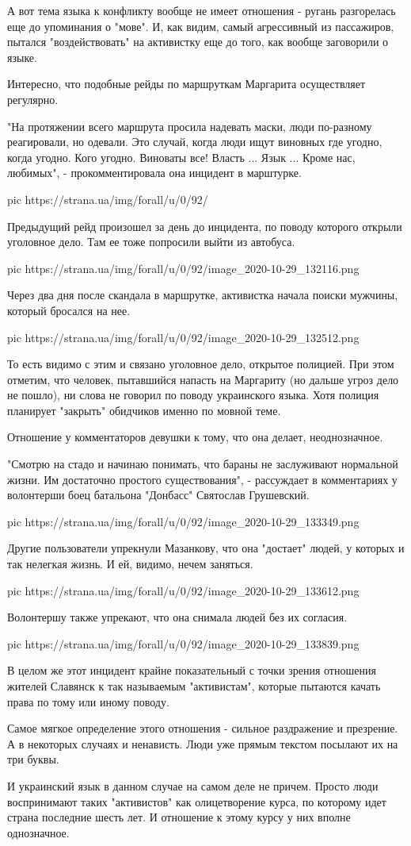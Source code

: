 А вот тема языка к конфликту вообще не имеет отношения - ругань разгорелась еще
до упоминания о "мове". И, как видим, самый агрессивный из пассажиров, пытался
"воздействовать" на активистку еще до того, как вообще заговорили о языке. 

Интересно, что подобные рейды по маршруткам Маргарита осуществляет регулярно. 

"На протяжении всего маршрута просила надевать маски, люди по-разному
реагировали, но одевали. Это случай, когда люди ищут виновных где угодно, когда
угодно. Кого угодно. Виноваты все! Власть ... Язык ... Кроме нас, любимых", -
прокомментировала она инцидент в марштурке.

\ifcmt
pic https://strana.ua/img/forall/u/0/92/%
\fi

Предыдущий рейд произошел за день до инцидента, по поводу которого открыли
уголовное дело. Там ее тоже попросили выйти из автобуса. 

\ifcmt
pic https://strana.ua/img/forall/u/0/92/image_2020-10-29_132116.png
\fi

Через два дня после скандала в маршрутке, активистка начала поиски мужчины,
который бросался на нее. 

\ifcmt
pic https://strana.ua/img/forall/u/0/92/image_2020-10-29_132512.png
\fi

То есть видимо с этим и связано уголовное дело, открытое полицией. При этом
отметим, что человек, пытавшийся напасть на Маргариту (но дальше угроз дело не
пошло), ни слова не говорил по поводу украинского языка. Хотя полиция планирует
"закрыть" обидчиков именно по мовной теме. 

Отношение у комментаторов девушки к тому, что она делает, неоднозначное. 

"Смотрю на стадо и начинаю понимать, что бараны не заслуживают нормальной
жизни. Им достаточно простого существования", - рассуждает в комментариях у
волонтерши боец батальона "Донбасс" Святослав Грушевский.

\ifcmt
pic https://strana.ua/img/forall/u/0/92/image_2020-10-29_133349.png
\fi

Другие пользователи упрекнули Мазанкову, что она "достает" людей, у которых и
так нелегкая жизнь. И ей, видимо, нечем заняться. 

\ifcmt
pic https://strana.ua/img/forall/u/0/92/image_2020-10-29_133612.png
\fi

Волонтершу также упрекают, что она снимала людей без их согласия.

\ifcmt
pic https://strana.ua/img/forall/u/0/92/image_2020-10-29_133839.png
\fi

В целом же этот инцидент крайне показательный с точки зрения отношения жителей
Славянск к так называемым "активистам", которые пытаются качать права по тому
или иному поводу.

Самое мягкое определение этого отношения - сильное раздражение и презрение. А в
некоторых случаях и ненависть. Люди уже прямым текстом посылают их на три
буквы.

И украинский язык в данном случае на самом деле не причем. Просто люди
воспринимают таких "активистов" как олицетворение курса, по которому идет
страна последние шесть лет. И отношение к этому курсу у них вполне однозначное.
